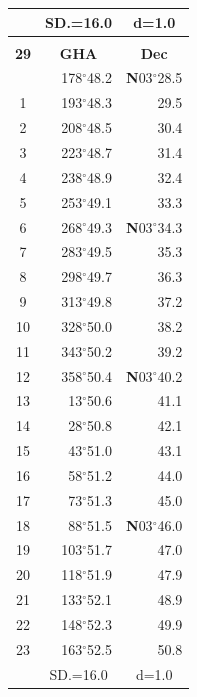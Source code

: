 \documentclass[10pt, a4paper]{report}
\begin{document}
\begin{scriptsize}
\begin{tabular*}{0.2\textwidth}[t]{@{\extracolsep{\fill}}|c|rr|}
\hline
\rule{0pt}{2.4ex} & \multicolumn{1}{c}{SD.=16.0} & \multicolumn{1}{c|}{d=1.0}\\
\hline
\multicolumn{1}{c}{}\\[-0.5ex]\hline
\multicolumn{1}{|c|}{\rule{0pt}{2.6ex}\textbf{29}} & \multicolumn{1}{c}{\textbf{GHA}} & \multicolumn{1}{c|}{\textbf{Dec}}\\
\hline\rule{0pt}{2.6ex}\noindent
0 & 178$^\circ$48.2 & \textbf{N}03$^\circ$28.5\\
1 & 193$^\circ$48.3 & 29.5\\
2 & 208$^\circ$48.5 & 30.4\\
3 & 223$^\circ$48.7 & \raisebox{0.24ex}{\boldmath$\cdot$~\boldmath$\cdot$~~}31.4\\
4 & 238$^\circ$48.9 & 32.4\\
5 & 253$^\circ$49.1 & 33.3\\[2Pt]
6 & 268$^\circ$49.3 & \textbf{N}03$^\circ$34.3\\
7 & 283$^\circ$49.5 & 35.3\\
8 & 298$^\circ$49.7 & 36.3\\
9 & 313$^\circ$49.8 & \raisebox{0.24ex}{\boldmath$\cdot$~\boldmath$\cdot$~~}37.2\\
10 & 328$^\circ$50.0 & 38.2\\
11 & 343$^\circ$50.2 & 39.2\\[2Pt]
12 & 358$^\circ$50.4 & \textbf{N}03$^\circ$40.2\\
13 & 13$^\circ$50.6 & 41.1\\
14 & 28$^\circ$50.8 & 42.1\\
15 & 43$^\circ$51.0 & \raisebox{0.24ex}{\boldmath$\cdot$~\boldmath$\cdot$~~}43.1\\
16 & 58$^\circ$51.2 & 44.0\\
17 & 73$^\circ$51.3 & 45.0\\[2Pt]
18 & 88$^\circ$51.5 & \textbf{N}03$^\circ$46.0\\
19 & 103$^\circ$51.7 & 47.0\\
20 & 118$^\circ$51.9 & 47.9\\
21 & 133$^\circ$52.1 & \raisebox{0.24ex}{\boldmath$\cdot$~\boldmath$\cdot$~~}48.9\\
22 & 148$^\circ$52.3 & 49.9\\
23 & 163$^\circ$52.5 & 50.8\\
\hline
\rule{0pt}{2.4ex} & \multicolumn{1}{c}{SD.=16.0} & \multicolumn{1}{c|}{d=1.0}\\
\hline
\end{tabular*}\noindent
\begin{tabular*}{0.2\textwidth}[t]{@{\extracolsep{\fill}}|c|rr|}

\end{tabular*}
\end{scriptsize}
\end{document}
